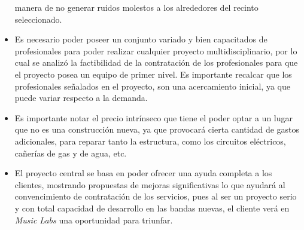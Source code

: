 \begin{itemize}
	  manera de no generar ruidos molestos a los alrededores del recinto seleccionado. %
	\item Es necesario poder poseer un conjunto variado y bien capacitados de profesionales para poder realizar cualquier proyecto
		multidisciplinario, por lo cual se analizó la factibilidad de la contratación de los profesionales para que el proyecto posea
		un equipo de primer nivel. Es importante recalcar que los profesionales señalados en el proyecto, son una acercamiento inicial,
		ya que puede variar respecto a la demanda.
	\item Es importante notar el precio intrínseco que tiene el poder optar a un lugar que no es una construcción nueva, ya que
		provocará cierta cantidad de gastos adicionales, para reparar tanto la estructura, como los circuitos eléctricos, cañerías
		de gas y de agua, etc.
	\item El proyecto central se basa en poder ofrecer una ayuda completa a los clientes, mostrando propuestas de mejoras significativas
		lo que ayudará al convencimiento de contratación de los servicios, pues al ser un proyecto serio y con total capacidad
		de desarrollo en las bandas nuevas, el cliente verá en \emph{Music Labs} una oportunidad para triunfar.
\end{itemize}

